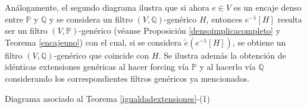 \documentclass[11pt]{unam_tesis1}
\theoremstyle{MyThmStyle}
\theoremstyle{definition}
\theoremstyle{plain}
\theoremstyle{remark}
\begin{document}
An\'alogamente, el segundo diagrama ilustra que si ahora $e\in V$ es un encaje denso entre $\mathbb P$ y $\mathbb Q$ y se considera un filtro $(V,\mathbb Q)$-gen\'erico $H$, entonces $e^{-1}[H]$ resulta ser un filtro $(V,\mathbb P)$-gen\'erico (v\'eanse Proposici\'on \ref{densoimplicacompleto} y Teorema \ref{encajeuno}) con el cual, si se considera $\tilde e(e^{-1}[H])$, se obtiene un filtro $(V,\mathbb Q)$-gen\'erico que coincide con $H$. Se ilustra adem\'as la obtenci\'on de id\'enticas extensiones gen\'ericas al hacer forcing v\'ia $\mathbb P$ y al hacerlo v\'ia $\mathbb Q$ considerando los correspondientes filtros gen\'ericos ya mencionados.

\begin{center}



\centering

Diagrama asociado al Teorema \ref{igualdadextensiones}-(1)

\end{center}
\end{document}
